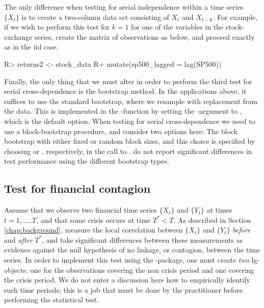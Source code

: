 The only difference when testing for serial independence within a time series \(\{X_t\}\) is to create a two-column data set consisting of
\(X_t\) and \(X_{t-k}\). For example, if we wish to perform this test for \(k=1\) for one of the variables in the stock-exchange series,
create the matrix of observations as below, and proceed exactly as in the iid case.

\begin{example}
R> returns2 <- stock_data %
R+   mutate(sp500_lagged = lag(SP500))
\end{example}

Finally, the only thing that we must alter in order to perform the third test for serial cross-dependence is the bootstrap method. In the applications above, it suffices to use the standard bootstrap, where we resample with replacement from the data. This is implemented in the -function by setting the -argument to , which is the default option. When testing for serial cross-dependence we need to use a block-bootstrap procedure, and \citet{laca:tjos:2018} consider two options here: The block bootstrap with either fixed \citep{kuns:1989} or random \citep{poli:roma:1994} block sizes, and this choice is specified by choosing  or , respectively, in the call to . \citet{laca:tjos:2018} do not report significant differences in test performance using the different bootstrap types.

\subsection{Test for financial contagion}\label{chap:cont}

Assume that we observe two financial time series \(\{X_t\}\) and \(\{Y_t\}\) at times \(t = 1,\ldots,T\), and that some crisis occurs at time \(T^* < T\). As described in Section \ref{chap:background}, \citet{stov:tjos:huft:2014} measure the local correlation between \(\{X_t\}\) and \(\{Y_t\}\) \emph{before} and \emph{after} \(T^*\), and take significant differences between these measurements as evidence against the null hypothesis of no linkage, or contagion, between the time series. In order to implement this test using the -package, one must create \emph{two} lg-objects: one for the observations covering the non crisis period and one covering the crisis period. We do not enter a discussion here how to empirically identify such time periods; this is a job that must be done by the practitioner before performing the statistical test.

